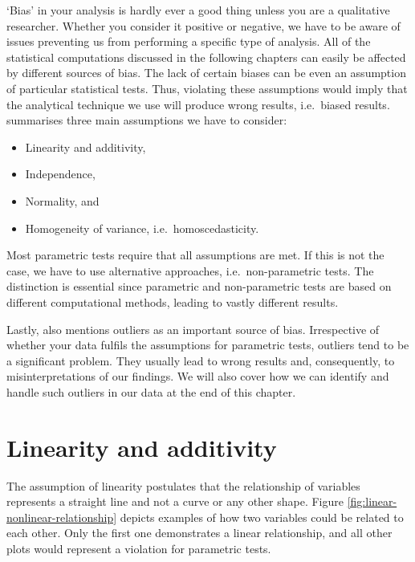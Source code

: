 \documentclass[
]{book}
\begin{document}
`Bias' in your analysis is hardly ever a good thing unless you are a qualitative researcher. Whether you consider it positive or negative, we have to be aware of issues preventing us from performing a specific type of analysis. All of the statistical computations discussed in the following chapters can easily be affected by different sources of bias. The lack of certain biases can be even an assumption of particular statistical tests. Thus, violating these assumptions would imply that the analytical technique we use will produce wrong results, i.e.~biased results. \citet{field2013discovering} summarises three main assumptions we have to consider:

\begin{itemize}
\item
  Linearity and additivity,
\item
  Independence,
\item
  Normality, and
\item
  Homogeneity of variance, i.e.~homoscedasticity.
\end{itemize}

Most parametric tests require that all assumptions are met. If this is not the case, we have to use alternative approaches, i.e.~non-parametric tests. The distinction is essential since parametric and non-parametric tests are based on different computational methods, leading to vastly different results.

Lastly, \citet{field2013discovering} also mentions outliers as an important source of bias. Irrespective of whether your data fulfils the assumptions for parametric tests, outliers tend to be a significant problem. They usually lead to wrong results and, consequently, to misinterpretations of our findings. We will also cover how we can identify and handle such outliers in our data at the end of this chapter.

\hypertarget{additivity-and-linearity}{%
\section{Linearity and additivity}\label{additivity-and-linearity}}

The assumption of linearity postulates that the relationship of variables represents a straight line and not a curve or any other shape. Figure \ref{fig:linear-nonlinear-relationship} depicts examples of how two variables could be related to each other. Only the first one demonstrates a linear relationship, and all other plots would represent a violation for parametric tests.
\end{document}
